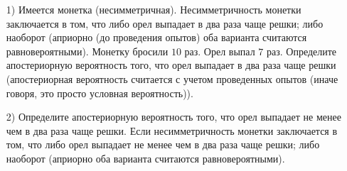 \begin{problem}
\begin{enumerate}
\item[1)] Имеется монетка (несимметричная). Несимметричность монетки заключается в том, что либо орел выпадает в два раза чаще решки; 
либо наоборот (априорно (до проведения опытов) оба варианта считаются равновероятными). Монетку бросили $10$ раз. Орел выпал $7$ раз. 
Определите апостериорную вероятность того, что орел выпадает в два раза чаще решки (апостериорная вероятность считается с учетом 
проведенных опытов (иначе говоря, это просто условная вероятность)). 

\item[2)] Определите апостериорную вероятность того, что орел выпадает не менее чем в два раза чаще решки. Если несимметричность 
монетки заключается в том, что либо орел выпадает не менее чем в два раза чаще решки; либо наоборот (априорно оба варианта считаются 
равновероятными). 
\end{enumerate}
\end{problem}